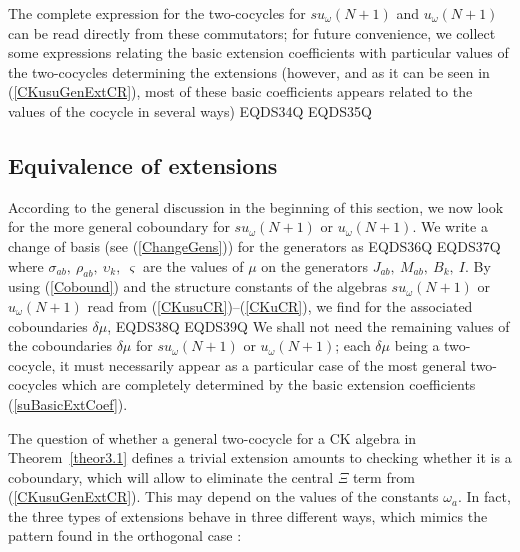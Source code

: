 \documentclass[12pt]{article}
\begin{document}
The complete expression for the two-cocycles for ${su}_{\omega}(N+1)$ and
${u}_{\omega}(N+1)$ can be read directly
from these commutators; for future convenience, we collect some
expressions relating the basic extension coefficients with
particular values of the two-cocycles determining the extensions
(however, and as it can be seen in (\ref{CKusuGenExtCR}), most of
these basic coefficients appears related to the values of the
cocycle in several ways)
EQDS34Q
EQDS35Q

\subsection{Equivalence of extensions}

According to the general discussion in the beginning of this section,
we now look for the more general coboundary for ${su}_{\omega}(N+1)$ or
${u}_{\omega}(N+1)$. We write a change of basis (see (\ref{ChangeGens}))
for the generators as
EQDS36Q
EQDS37Q
where ${\sigma}_{ab},\ {\rho}_{ab},\ {\upsilon}_{k},\ {\varsigma}$ are the values
of $\mu$ on the generators ${J}_{ab},\ {M}_{ab},\ {B}_{k},\ {I}$.
By using (\ref{Cobound}) and the structure constants of the algebras
${su}_{\omega}(N+1)$ or ${u}_{\omega}(N+1)$
read from (\ref{CKusuCR})--(\ref{CKuCR}),
we find for the associated coboundaries $\delta\mu$,
EQDS38Q
EQDS39Q
We shall not need the remaining values of the coboundaries $\delta\mu$ for
${su}_{\omega}(N+1)$ or ${u}_{\omega}(N+1)$;  each
$\delta\mu$ being a two-cocycle, it must necessarily appear as a
particular case of the most general two-cocycles which are completely
determined by the basic extension coefficients (\ref{suBasicExtCoef}).

The question of whether a general two-cocycle for a CK
algebra in Theorem~\ref{theor3.1} defines a trivial extension
amounts to checking whether it is a coboundary, which will allow to
eliminate the central $\Xi$ term from (\ref{CKusuGenExtCR}). This
may depend on the values of the constants ${\omega}_a$. In fact, the
three types of extensions  behave in three different ways, which
mimics the pattern found in the orthogonal case \cite{Azc.Her.Bue.San:96}:
\end{document}
